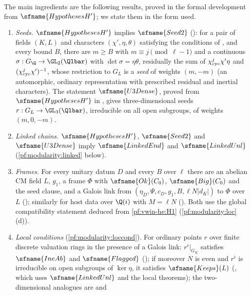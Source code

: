 The main ingredients are the following results, proved in the formal development from $\sfname{HypothesesH'}$; we
state them in the form used.
\begin{enumerate}[label=(E\arabic*)]
\item\label{pf:modularity:E1} \emph{Seeds.} $\sfname{HypothesesH'}$ implies $\sfname{Seed2}$
(): for a pair of fields $(K,L)$ and characters $(\chi',\eta,\theta)$
satisfying the conditions of \cite{LeanSource2026}, and every bound $B$, there are $m\ge B$ with $m\equiv j\pmod{\ell-1}$
and a continuous $\sigma:G_\Q\to\GL_2(\Qlbar)$ with $\det\sigma=\eta\theta$, residually the sum of
$\chi_{\mathrm{cyc}}^j\chi'\eta$ and $(\chi_{\mathrm{cyc}}^j\chi')^{-1}$, whose restriction to $G_L$ is a \emph{seed} of weights
$(m,-m)$ (an automorphic, ordinary representation with prescribed residual and inertial characters). The statement
$\sfname{U3Dense}$, proved from $\sfname{HypothesesH'}$ in
, gives three-dimensional seeds
$r:G_L\to\GL_3(\Qlbar)$, irreducible on all open subgroups, of weights $(m,0,-m)$.
\item\label{pf:modularity:E2} \emph{Linked chains.} $\sfname{HypothesesH'}$, $\sfname{Seed2}$ and $\sfname{U3Dense}$
imply $\sfname{LinkedEnd}$ and $\sfname{LinkedUnl}$ (\cref{pf:modularity:linked} below).
\item\label{pf:modularity:E3} \emph{Frames.} For every unitary datum $D$ and every $B$ over $\ell$ there are an abelian
CM field $L$, $g_1$, a frame $\Phi$ with $\sfname{Ok}(C_0)$, $\sfname{Big}(C_0)$ and the seed clause, and a Galois link
from $(\eta_D,\Psi,c_D,g_1,B,\ell N|d_K|)$ to $\Phi$ over $L$ (); similarly for host
data over $\Q(i)$ with $M=\ell N$ (). Both use the global compatibility statement
deduced from \ref{pf:vwin-he:H1} (\cref{pf:modularity:loc}(d)).
\item\label{pf:modularity:E4} \emph{Local conditions} (\cref{pf:modularity:loccond}). For ordinary points $r$ over finite discrete valuation rings in
the presence of a Galois link: $r^\flat|_{G_K}$ satisfies $\sfname{IneAb}$ and $\sfname{Flagged}$
(); if moreover $N$ is even and
$r^\flat$ is irreducible on open subgroups of $\ker\eta$, it satisfies $\sfname{Keeps}(L)$
(, which uses $\sfname{LinkedUnl}$ and the local theorems);
the two-dimensional analogues are  and

\end{enumerate}
